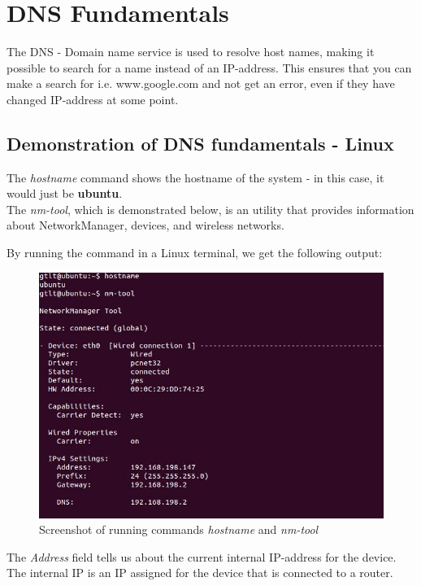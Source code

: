 \section{DNS Fundamentals}

The DNS - Domain name service is used to resolve host names, making it possible to search for a name instead of an IP-address. This ensures that you can make a search for i.e. www.google.com and not get an error, even if they have changed IP-address at some point.

\subsection{Demonstration of DNS fundamentals - Linux}

The \textit{hostname} command shows the hostname of the system - in this case, it would just be \textbf{ubuntu}.\\

The \textit{nm-tool}, which is demonstrated below, is an utility that provides information about NetworkManager, devices, and wireless networks.

By running the command in a Linux terminal, we get the following output:

\begin{figure}[ht!]
\centering
\includegraphics[width=150mm]{img/nm-tool.png}
\caption{Screenshot of running commands \textit{hostname} and \textit{nm-tool}}
\label{nm-tool}
\end{figure}

The \textit{Address} field tells us about the current internal IP-address for the device. The internal IP is an IP assigned for the device that is connected to a router. \\

